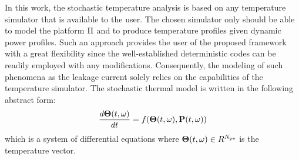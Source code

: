 In this work, the stochastic temperature analysis is based on any temperature simulator that is available to the user. The chosen simulator only should be able to model the platform $\Pi$ and to produce temperature profiles given dynamic power profiles. Such an approach provides the user of the proposed framework with a great flexibility since the well-established deterministic codes can be readily employed with any modifications. Consequently, the modeling of such phenomena as the leakage current solely relies on the capabilities of the temperature simulator. The stochastic thermal model is written in the following abstract form:
\begin{equation} \elabel{thermal-model}
  \frac{d\vT(\t, \o)}{dt} = f(\vT(\t, \o), \vPP(\t, \o))
\end{equation}
which is a system of differential equations where ${\boldsymbol\Theta}(t, \omega) \in R^{N_\text{pe}}$ is the temperature vector.

